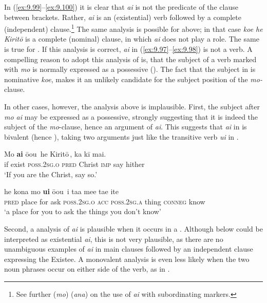 In (\ref{ex:9.99}–\ref{ex:9.100}) it is clear that \textit{ai} is not the predicate of the clause between brackets. Rather, \textit{ai} is an (existential) verb followed by a complete (independent) clause.\footnote{\label{fn:481}See further  (\textit{mo})  (\textit{ana}) on the use of \textit{ai} with subordinating markers.} The same analysis is possible for  above; in that case \textit{koe he Kiritō} is a complete (nominal) clause, in which \textit{ai} does not play a role. The same is true for . If this analysis is correct, \textit{ai} in (\ref{ex:9.97}–\ref{ex:9.98}) is not a  verb. A compelling reason to adopt this analysis of  is, that the subject of a verb marked with \textit{mo} is normally expressed as a possessive (). The fact that the subject in  is nominative \textit{koe}, makes it an unlikely candidate for the subject position of the \textit{mo-}clause. 

In other cases, however, the analysis above is implausible. First, the subject after \textit{mo ai} may be expressed as a possessive, strongly suggesting that it is indeed the subject of the \textit{mo}{}-clause, hence an argument of \textit{ai}. This suggests that \textit{ai} in  is bivalent (hence ), taking two arguments just like the transitive verb \textit{{\ꞌ}ui} in .

\ea\label{ex:9.101}
\gll Mo \textbf{ai} {\ob}ō{\ꞌ}ou\,{\cb} {\ob}he Kiritō\,{\cb}, ka kī mai. \\
if exist {\db}\textsc{poss.2sg.o} {\db}\textsc{pred} Christ \textsc{imp} say hither \\

\glt 
‘If you are the Christ, say so.’ \textstyleExampleref{[Luk. 22:67]}
\z

\ea\label{ex:9.102}
\gll he kona mo \textbf{{\ꞌ}ui} {\ob}ō{\ꞌ}ou\,{\cb} {\ob}i ta{\ꞌ}a me{\ꞌ}e ta{\ꞌ}e {\ꞌ}ite\,{\cb}\\
\textsc{pred} place for ask {\db}\textsc{poss.2sg.o} {\db}\textsc{acc} \textsc{poss.2sg.a} thing \textsc{conneg} know\\

\glt
‘a place for you to ask the things you don’t know’ \textstyleExampleref{[R239.049]} 
\z

Second, a  analysis of \textit{ai} is plausible when it occurs in a . Although  below could be interpreted as existential \textit{ai}, this is not very plausible, as there are no unambiguous examples of \textit{ai} in main clauses followed by an independent clause expressing the Existee. A monovalent analysis is even less likely when the two noun phrases occur on either side of the verb, as in . 

